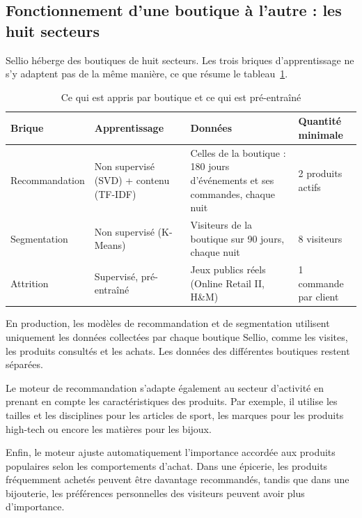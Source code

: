 \subsection{Fonctionnement d'une boutique à l'autre : les huit secteurs}
Sellio héberge des boutiques de huit secteurs. Les trois briques d'apprentissage ne s'y adaptent pas de la même manière, ce que résume le tableau~\ref{tab:ml-par-brique}.
\begin{table}[H]
\centering
\renewcommand{\arraystretch}{1.3}
\small
\begin{tabular}{|p{3cm}|p{3.6cm}|p{4.2cm}|p{3.4cm}|}
\hline
\textbf{Brique} & \textbf{Apprentissage} & \textbf{Données} & \textbf{Quantité minimale} \\
\hline
Recommandation & Non supervisé (SVD) + contenu (TF-IDF) & Celles de la boutique : 180 jours d'événements et ses commandes, chaque nuit & 2 produits actifs \\
\hline
Segmentation & Non supervisé (K-Means) & Visiteurs de la boutique sur 90 jours, chaque nuit & 8 visiteurs \\
\hline
Attrition & Supervisé, pré-entraîné & Jeux publics réels (Online Retail II, H\&M) & 1 commande par client \\
\hline
\end{tabular}
\caption{Ce qui est appris par boutique et ce qui est pré-entraîné}
\label{tab:ml-par-brique}
\end{table}


En production, les modèles de recommandation et de segmentation utilisent uniquement les données collectées par chaque boutique Sellio, comme les visites, les produits consultés et les achats. Les données des différentes boutiques restent séparées.

Le moteur de recommandation s'adapte également au secteur d'activité en prenant en compte les caractéristiques des produits. Par exemple, il utilise les tailles et les disciplines pour les articles de sport, les marques pour les produits high-tech ou encore les matières pour les bijoux.

Enfin, le moteur ajuste automatiquement l'importance accordée aux produits populaires selon les comportements d'achat. Dans une épicerie, les produits fréquemment achetés peuvent être davantage recommandés, tandis que dans une bijouterie, les préférences personnelles des visiteurs peuvent avoir plus d'importance.



